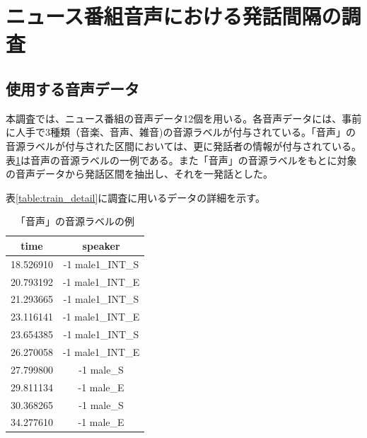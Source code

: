 \section{ニュース番組音声における発話間隔の調査}
\label{section:research_news}

\subsection{使用する音声データ}
\label{section:detail_train_news}
本調査では、ニュース番組の音声データ12個を用いる。各音声データには、事前に人手で3種類（音楽、音声、雑音)の音源ラベルが付与されている。「音声」の音源ラベルが付与された区間においては、更に発話者の情報が付与されている。表\ref{fig:example_label}は音声の音源ラベルの一例である。また「音声」の音源ラベルをもとに対象の音声データから発話区間を抽出し、それを一発話とした。\par
表\ref{table:train_detail}に調査に用いるデータの詳細を示す。\vspace{0.2in}

\begin{table}[H]
\begin{center}
\caption{「音声」の音源ラベルの例 \label{fig:example_label}}
\begin{tabular}{|c|c|}
\hline
time      & speaker          \\ \hline
18.526910 & -1 male1\_INT\_S \\ \hline
20.793192 & -1 male1\_INT\_E \\ \hline
21.293665 & -1 male1\_INT\_S \\ \hline
23.116141 & -1 male1\_INT\_E \\ \hline
23.654385 & -1 male1\_INT\_S \\ \hline
26.270058 & -1 male1\_INT\_E \\ \hline
27.799800 & -1 male\_S       \\ \hline
29.811134 & -1 male\_E       \\ \hline
30.368265 & -1 male\_S       \\ \hline
34.277610 & -1 male\_E       \\ \hline
\end{tabular}
\end{center}
\end{table}

